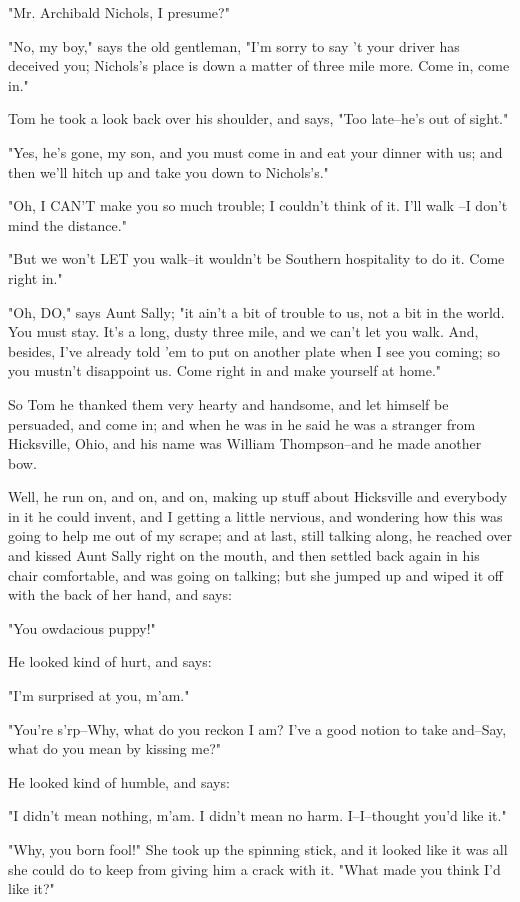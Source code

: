 "Mr. Archibald Nichols, I presume?"

"No, my boy," says the old gentleman, "I'm sorry to say 't your driver
has deceived you; Nichols's place is down a matter of three mile more.
Come in, come in."

Tom he took a look back over his shoulder, and says, "Too late--he's out
of sight."

"Yes, he's gone, my son, and you must come in and eat your dinner with
us; and then we'll hitch up and take you down to Nichols's."

"Oh, I CAN'T make you so much trouble; I couldn't think of it.  I'll walk
--I don't mind the distance."

"But we won't LET you walk--it wouldn't be Southern hospitality to do it.
Come right in."

"Oh, DO," says Aunt Sally; "it ain't a bit of trouble to us, not a bit in
the world.  You must stay.  It's a long, dusty three mile, and we can't
let you walk.  And, besides, I've already told 'em to put on another
plate when I see you coming; so you mustn't disappoint us.  Come right in
and make yourself at home."

So Tom he thanked them very hearty and handsome, and let himself be
persuaded, and come in; and when he was in he said he was a stranger from
Hicksville, Ohio, and his name was William Thompson--and he made another
bow.

Well, he run on, and on, and on, making up stuff about Hicksville and
everybody in it he could invent, and I getting a little nervious, and
wondering how this was going to help me out of my scrape; and at last,
still talking along, he reached over and kissed Aunt Sally right on the
mouth, and then settled back again in his chair comfortable, and was
going on talking; but she jumped up and wiped it off with the back of her
hand, and says:

"You owdacious puppy!"

He looked kind of hurt, and says:

"I'm surprised at you, m'am."

"You're s'rp--Why, what do you reckon I am?  I've a good notion to take
and--Say, what do you mean by kissing me?"

He looked kind of humble, and says:

"I didn't mean nothing, m'am.  I didn't mean no harm.  I--I--thought
you'd like it."

"Why, you born fool!"  She took up the spinning stick, and it looked like
it was all she could do to keep from giving him a crack with it.  "What
made you think I'd like it?"


